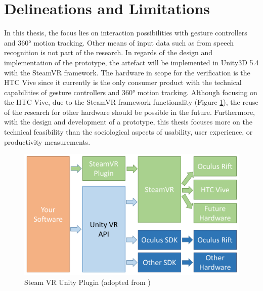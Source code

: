 



\section{Delineations and Limitations}

In this thesis, the focus lies on interaction possibilities with gesture controllers and 360° motion tracking. Other means of input data such as from speech recognition is not part of the research.
In regards of the design and implementation of the prototype, the artefact will be implemented in Unity3D 5.4 with the SteamVR framework. The hardware in scope for the verification is the HTC Vive since it currently is the only consumer product with the  technical capabilities of gesture controllers and 360° motion tracking. Although focusing on the HTC Vive, due to the SteamVR framework functionality (Figure \ref{fig:steamvr}), the reuse of the research for other hardware should be possible in the future. \newline
Furthermore, with the design and development of a prototype, this thesis focuses more on the technical feasibility than the sociological aspects of usability, user experience, or productivity measurements. 
\begin{figure}[h]
	\begin{center}
		\includegraphics[width=14cm]{03_Figures/04_Valve/OpenVR_SteamVR.png}
		\caption[Steam VR Unity Plugin]{Steam VR Unity Plugin (adopted from \cite{Valve2016})}
		\label{fig:steamvr}
	\end{center}
\end{figure}


